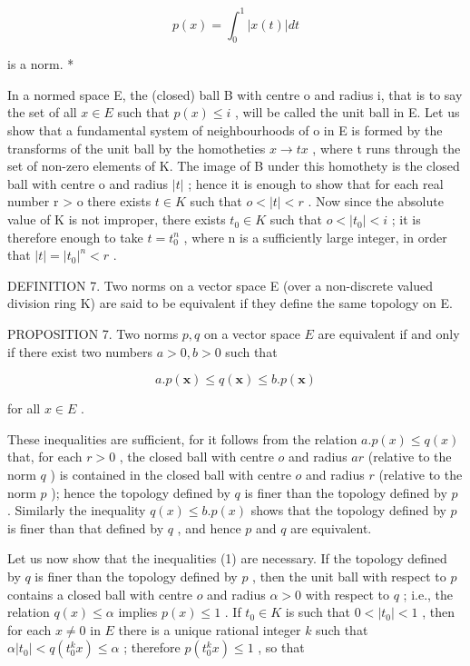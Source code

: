 \[
p (x) = \int_ {0} ^ {1} | x (t) | d t
\]

is a norm. *

In a normed space E, the (closed) ball B with centre o and radius i, that is to say the set of all \(x \in E\) such that \(p(x) \leqslant i\) , will be called the unit ball in E. Let us show that a fundamental system of neighbourhoods of o in E is formed by the transforms of the unit ball by the homotheties \(x \to tx\) , where t runs through the set of non-zero elements of K. The image of B under this homothety is the closed ball with centre o and radius \(|t|\) ; hence it is enough to show that for each real number r \textgreater{} o there exists \(t \in K\) such that \(o < |t| < r\) . Now since the absolute value of K is not improper, there exists \(t_{0} \in K\) such that \(o < |t_{0}| < i\) ; it is therefore enough to take \(t = t_{0}^{n}\) , where n is a sufficiently large integer, in order that \(|t| = |t_{0}|^{n} < r\) .

DEFINITION 7. Two norms on a vector space E (over a non-discrete valued division ring K) are said to be equivalent if they define the same topology on E.

PROPOSITION 7. Two norms \(p, q\) on a vector space \(E\) are equivalent if and only if there exist two numbers \(a > 0, b > 0\) such that

\[
a. p (\pmb {x}) \leqslant q (\pmb {x}) \leqslant b. p (\pmb {x})\tag{I}
\]

for all \(x \in E\) .

These inequalities are sufficient, for it follows from the relation \(a.p(x) \leqslant q(x)\) that, for each \(r > 0\) , the closed ball with centre \(o\) and radius \(ar\) (relative to the norm \(q\) ) is contained in the closed ball with centre \(o\) and radius \(r\) (relative to the norm \(p\) ); hence the topology defined by \(q\) is finer than the topology defined by \(p\) . Similarly the inequality \(q(x) \leqslant b.p(x)\) shows that the topology defined by \(p\) is finer than that defined by \(q\) , and hence \(p\) and \(q\) are equivalent.

Let us now show that the inequalities (1) are necessary. If the topology defined by \(q\) is finer than the topology defined by \(p\) , then the unit ball with respect to \(p\) contains a closed ball with centre \(o\) and radius \(\alpha > 0\) with respect to \(q\) ; i.e., the relation \(q(x) \leqslant \alpha\) implies \(p(x) \leqslant 1\) . If \(t_0 \in K\) is such that \(0 < |t_0| < 1\) , then for each \(x \neq 0\) in \(E\) there is a unique rational integer \(k\) such that \(\alpha |t_0| < q(t_0^k x) \leqslant \alpha\) ; therefore \(p(t_0^k x) \leqslant 1\) , so that

